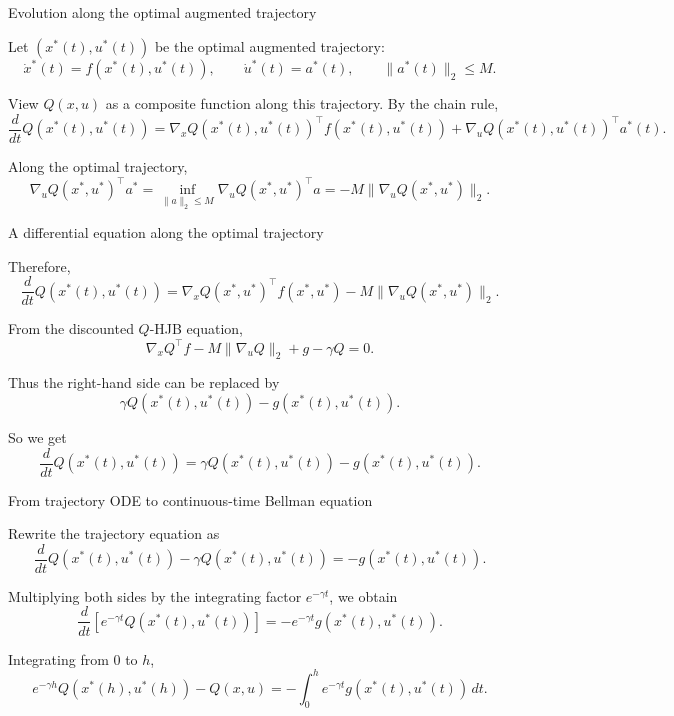 \documentclass[aspectratio=169]{beamer}
\begin{document}
\begin{frame}{Evolution along the optimal augmented trajectory}

Let \((x^*(t),u^*(t))\) be the optimal augmented trajectory:
\[
\dot{x}^*(t)=f(x^*(t),u^*(t)),
\qquad
\dot{u}^*(t)=a^*(t),
\qquad
\|a^*(t)\|_2\le M .
\]

\vspace{0.15cm}

View \(Q(x,u)\) as a composite function along this trajectory.
By the chain rule,
\[
\frac{d}{dt}Q(x^*(t),u^*(t))
=
\nabla_x Q(x^*(t),u^*(t))^\top f(x^*(t),u^*(t))
+
\nabla_u Q(x^*(t),u^*(t))^\top a^*(t).
\]

\vspace{0.15cm}

Along the optimal trajectory,
\[
\nabla_u Q(x^*,u^*)^\top a^*
=
\inf_{\|a\|_2\le M}
\nabla_u Q(x^*,u^*)^\top a
=
-M\|\nabla_u Q(x^*,u^*)\|_2 .
\]

\end{frame}


\begin{frame}{A differential equation along the optimal trajectory}

Therefore,
\[
\frac{d}{dt}Q(x^*(t),u^*(t))
=
\nabla_x Q(x^*,u^*)^\top f(x^*,u^*)
-
M\|\nabla_u Q(x^*,u^*)\|_2 .
\]

\vspace{0.15cm}

From the discounted \(Q\)-HJB equation,
\[
\nabla_x Q^\top f
-
M\|\nabla_u Q\|_2
+
g
-
\gamma Q
=
0.
\]

\vspace{0.15cm}

Thus the right-hand side can be replaced by
\[
\gamma Q(x^*(t),u^*(t))
-
g(x^*(t),u^*(t)).
\]

\vspace{0.15cm}

So we get
\[
\frac{d}{dt}Q(x^*(t),u^*(t))
=
\gamma Q(x^*(t),u^*(t))
-
g(x^*(t),u^*(t)).
\]

\end{frame}


\begin{frame}{From trajectory ODE to continuous-time Bellman equation}

Rewrite the trajectory equation as
\[
\frac{d}{dt}Q(x^*(t),u^*(t))
-
\gamma Q(x^*(t),u^*(t))
=
-
g(x^*(t),u^*(t)).
\]

\vspace{0.15cm}

Multiplying both sides by the integrating factor \(e^{-\gamma t}\), we obtain
\[
\frac{d}{dt}
\left[
e^{-\gamma t}Q(x^*(t),u^*(t))
\right]
=
-
e^{-\gamma t}g(x^*(t),u^*(t)).
\]

\vspace{0.15cm}

Integrating from \(0\) to \(h\),
\[
e^{-\gamma h}Q(x^*(h),u^*(h))
-
Q(x,u)
=
-
\int_0^h e^{-\gamma t}g(x^*(t),u^*(t))\,dt .
\]

\end{frame}
\end{document}
